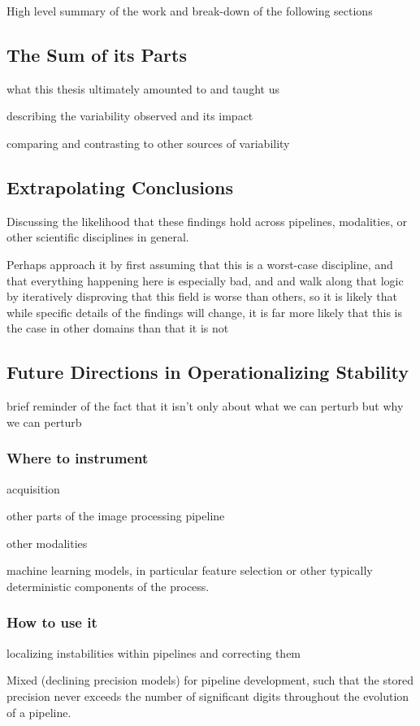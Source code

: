 High level summary of the work and break-down of the following sections

\subsection{The Sum of its Parts}
what this thesis ultimately amounted to and taught us

describing the variability observed and its impact

comparing and contrasting to other sources of variability 

\subsection{Extrapolating Conclusions}
Discussing the likelihood that these findings hold across pipelines, modalities, or other scientific disciplines in
general.

Perhaps approach it by first assuming that this is a worst-case discipline, and that everything happening here is
especially bad, and and walk along that logic by iteratively disproving that this field is worse than others, so it is
likely that while specific details of the findings will change, it is far more likely that this is the case in other
domains than that it is not

\subsection{Future Directions in Operationalizing Stability}
brief reminder of the fact that it isn't only about what we can perturb but why we can perturb

\subsubsection{Where to instrument}
acquisition

other parts of the image processing pipeline

other modalities

machine learning models, in particular feature selection or other typically deterministic components of the process.

\subsubsection{How to use it}
localizing instabilities within pipelines and correcting them

Mixed (declining precision models) for pipeline development, such that the stored precision never exceeds the number of
significant digits throughout the evolution of a pipeline.

